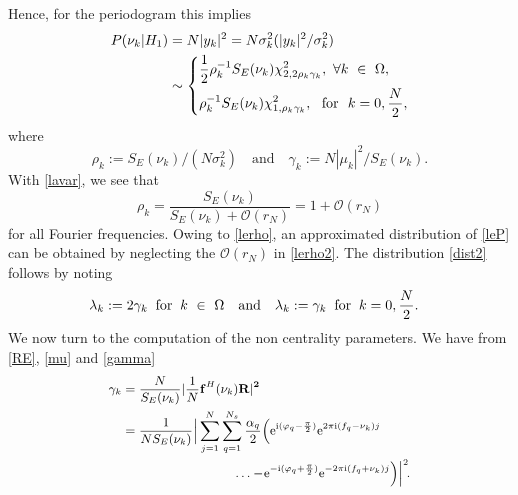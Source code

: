 \documentclass[journal]{IEEEtran}
\begin{document}
Hence,  for the periodogram this implies
\begin{equation} 
\begin{aligned} 
P(\nu_k | H_1)& = N|y_k|^2 = N\sigma^2_k(|y_k|^2/\sigma^2_k)\\
& \sim
  \left\{         
      \begin{aligned}
	 &\frac{1}{2}\rho^{-1}_k S_E(\nu_k) \chi_{2, 2\rho_k \gamma_k}^2 ,~ \forall k ~ \in ~ \Omega,  \\
	 &\rho^{-1}_k S_E(\nu_k)  \chi^2_{1,\rho_k \gamma_k }, ~ \text{ for } ~ k = 0, \frac{N}{2},
      \end{aligned}
    \right.
      \end{aligned}
      \vspace{-0.2cm}
       \label{leP}
\end{equation}
where 
\vspace{-0.2cm}
\begin{equation}
\rho_k:=S_E(\nu_k)/(N\sigma^2_k) \quad{\textrm{and}}\quad\gamma_k:=N|\mu_k|^2/S_E(\nu_k).
\label{gamma}
\end{equation} 
With \eqref{lavar}, we see that
\begin{equation}
	\rho_k=\frac{S_E(\nu_k)}{S_E(\nu_k)+{\mathcal{O}(r_N)}}=1+{\mathcal{O}(r_N)}
	 \label{lerho2}
\end{equation}
 for all Fourier frequencies.
 Owing to \eqref{lerho}, an approximated distribution of  \eqref{leP} can be obtained by neglecting
  the $\mathcal{O}(r_N)$ in { \eqref{lerho2}}. The distribution \eqref{dist2} follows by noting
\begin{equation}
	\hspace{-3mm}
	\lambda_k:=2\gamma_k\;\; \text{for}\;\; k ~ \in ~ \Omega\quad \text{and}\quad \lambda_k:=\gamma_k \;\; \text{for}  \;\; k = 0, \frac{N}{2}.
\label{fact}
\end{equation} 
 We now turn to the computation of the non centrality parameters. We have from \eqref{RE}, \eqref{mu} and \eqref{gamma}
\begin{equation} \small 
	  \begin{aligned}
	\gamma_k &= \frac{N}{S_E(\nu_k)} |  \frac{1}{N} {\bf{f}}^H(\nu_k)\bf{R}|^2\\
	 &= \frac{1}{NS_E(\nu_k)}  \Big| \sum_{j =1}^{N}   \sum_{q=1}^{N_s}  \frac{\alpha_q}{2} \Big( \mathrm{e}^{{\rm{i}} (\varphi_q-\frac{\pi}{2})} \mathrm{e}^{2\pi {\rm{i}} (f_q-\nu_k) j } \! \\
	 &~~~~~~~~~~~~~~~~~~~~~~~~~~\hdots  - \!\mathrm{e}^{-{\rm{i}} (\varphi_q+\frac{\pi}{2})} \mathrm{e}^{-2\pi {\rm{i}} (f_q+\nu_k) j} \Big) \Big|^2\!. \\
	 \end{aligned}
 	\label{gamma3}
\end{equation}
\end{document}
